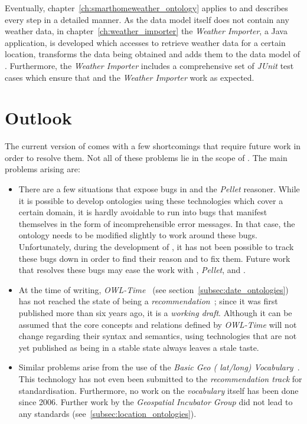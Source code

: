 Eventually, chapter~\ref{ch:smarthomeweather_ontology} applies \methontology to \smarthomeweather and describes every step in a detailed manner. As the data model itself does not contain any weather data, in chapter~\ref{ch:weather_importer} the \emph{Weather Importer}, a Java application, is developed which accesses \yrno to retrieve weather data for a certain location, transforms the data being obtained and adds them to the data model of \smarthomeweather. Furthermore, the \emph{Weather Importer} includes a comprehensive set of \emph{JUnit} test cases which ensure that \smarthomeweather and the \emph{Weather Importer} work as expected.

\vspace{1em}

\section{Outlook}

The current version of \smarthomeweather comes with a few shortcomings that require future work in order to resolve them. Not all of these problems lie in the scope of \smarthomeweather. The main problems arising are:

\begin{itemize}
  \item There are a few situations that expose bugs in \protege and the \emph{Pellet} reasoner. While it is possible to develop ontologies using these technologies which cover a certain domain, it is hardly avoidable to run into bugs that manifest themselves in the form of incomprehensible error messages. In that case, the ontology needs to be modified slightly to work around these bugs. Unfortunately, during the development of \smarthomeweather, it has not been possible to track these bugs down in order to find their reason and to fix them. Future work that resolves these bugs may ease the work with \protege, \emph{Pellet}, and \smarthomeweather.
  
  \item At the time of writing, \emph{OWL-Time}~\cite{owl-time} (see section~\ref{subsec:date_ontologies}) has not reached the state of being a \emph{ recommendation}~\cite{w3c-process}; since it was first published more than six years ago, it is a \emph{working draft}. Although it can be assumed that the core concepts and relations defined by \emph{OWL-Time} will not change regarding their syntax and semantics, using technologies that are not yet published as being in a stable state always leaves a stale taste. %
  
  \item Similar problems arise from the use of the \emph{Basic Geo ( lat/long) Vocabulary}~\cite{wgs84_vocabulary}. This technology has not even been submitted to the \emph{ recommendation track} for standardisation. Furthermore, no work on the \emph{ vocabulary} itself has been done since 2006. Further work by the \emph{ Geospatial Incubator Group} did not lead to any standards (see~\ref{subsec:location_ontologies}).
\end{itemize}

